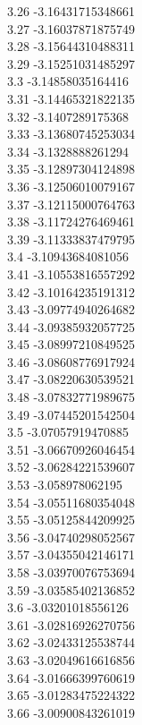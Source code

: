 {3.26	-3.16431715348661\\
3.27	-3.16037871875749\\
3.28	-3.15644310488311\\
3.29	-3.15251031485297\\
3.3	-3.14858035164416\\
3.31	-3.14465321822135\\
3.32	-3.1407289175368\\
3.33	-3.13680745253034\\
3.34	-3.1328888261294\\
3.35	-3.12897304124898\\
3.36	-3.12506010079167\\
3.37	-3.12115000764763\\
3.38	-3.11724276469461\\
3.39	-3.11333837479795\\
3.4	-3.10943684081056\\
3.41	-3.10553816557292\\
3.42	-3.10164235191312\\
3.43	-3.09774940264682\\
3.44	-3.09385932057725\\
3.45	-3.08997210849525\\
3.46	-3.08608776917924\\
3.47	-3.08220630539521\\
3.48	-3.07832771989675\\
3.49	-3.07445201542504\\
3.5	-3.07057919470885\\
3.51	-3.06670926046454\\
3.52	-3.06284221539607\\
3.53	-3.058978062195\\
3.54	-3.05511680354048\\
3.55	-3.05125844209925\\
3.56	-3.04740298052567\\
3.57	-3.04355042146171\\
3.58	-3.03970076753694\\
3.59	-3.03585402136852\\
3.6	-3.03201018556126\\
3.61	-3.02816926270756\\
3.62	-3.02433125538744\\
3.63	-3.02049616616856\\
3.64	-3.01666399760619\\
3.65	-3.01283475224322\\
3.66	-3.00900843261019\\
}
